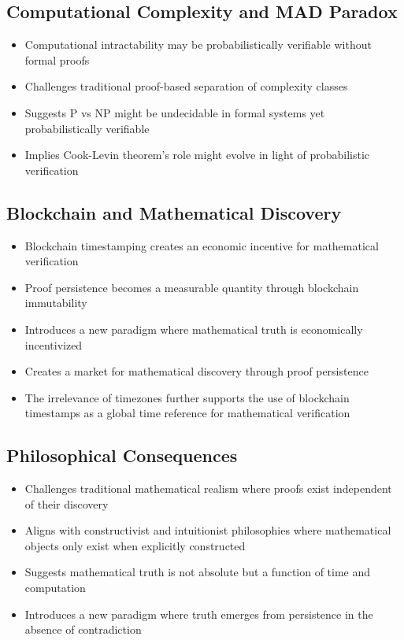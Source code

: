 \documentclass{article}
\begin{document}
\subsection{Computational Complexity and MAD Paradox}
\begin{itemize}
    \item Computational intractability may be probabilistically verifiable without formal proofs
    \item Challenges traditional proof-based separation of complexity classes
    \item Suggests P vs NP might be undecidable in formal systems yet probabilistically verifiable
    \item Implies Cook-Levin theorem's role might evolve in light of probabilistic verification
\end{itemize}

\subsection{Blockchain and Mathematical Discovery}
\begin{itemize}
    \item Blockchain timestamping creates an economic incentive for mathematical verification
    \item Proof persistence becomes a measurable quantity through blockchain immutability
    \item Introduces a new paradigm where mathematical truth is economically incentivized
    \item Creates a market for mathematical discovery through proof persistence
    \item The irrelevance of timezones \cite{Houk2024Timezones} further supports the use of blockchain timestamps as a global time reference for mathematical verification
\end{itemize}

\subsection{Philosophical Consequences}
\begin{itemize}
    \item Challenges traditional mathematical realism where proofs exist independent of their discovery
    \item Aligns with constructivist and intuitionist philosophies where mathematical objects only exist when explicitly constructed
    \item Suggests mathematical truth is not absolute but a function of time and computation
    \item Introduces a new paradigm where truth emerges from persistence in the absence of contradiction
\end{itemize}
\end{document}
